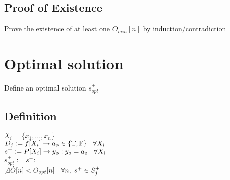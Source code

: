 \documentclass[11pt]{article}
\begin{document}
\subsection{Proof of Existence}
Prove the existence of at least one $O_{min}[n]$ by induction/contradiction








\section{Optimal solution}
Define an optimal solution $s_{opt}^+$

\subsection{Definition}
\begin{center}
$
X_i = \{x_1,...,x_n\}
$
\\ \vspace{2mm}
$
D_j := f \lbrack X_i \rbrack \rightarrow a_{o} \in \{\mathbb{T}, \mathbb{F}\} \hspace{3mm} \forall X_i
$
\\ \vspace{2mm}
$
s^+ := P \lbrack X_i \rbrack \rightarrow y_{o} : y_o = a_{o} \hspace{3mm} \forall X_i
$
\\ \vspace{2mm}
$
s_{opt}^+ := s^+ :
$
\\ \vspace{2mm}
$
\not \exists \hat{O} \lbrack n \rbrack < O_{opt}[n] \hspace{3mm} \forall n, \hspace{1mm}  s^+ \in S_j^+
$
\end{center}
\end{document}
